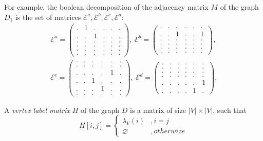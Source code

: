 For example, the boolean decomposition of the adjacency matrix $M$ of the graph $D_1$ is the set of matrices $\mathcal{E}^a, \mathcal{E}^b, \mathcal{E}^c, \mathcal{E}^d$:
{
    \renewcommand{\arraystretch}{0.5}
    \setlength\arraycolsep{1.5pt}
\begin{align*}
\mathcal{E}^a =
\begin{pmatrix}
    . & 1 & . & . & . & . \\
    . & . & 1 & . & . & . \\
    . & . & . & . & . & . \\
    . & . & . & . & . & . \\
    . & . & . & . & . & . \\
    . & . & . & . & . & .
\end{pmatrix},~
\mathcal{E}^b =
\begin{pmatrix}
    . & . & . & . & . & . \\
    . & . & 1 & . & . & 1 \\
    . & . & . & . & . & . \\
    . & . & . & . & . & . \\
    . & . & . & . & . & . \\
    . & . & . & . & . & .
\end{pmatrix},\\
\mathcal{E}^c =
\begin{pmatrix}
    . & . & . & . & . & . \\
    . & . & . & . & . & . \\
    . & . & . & . & 1 & . \\
    . & . & 1 & . & . & . \\
    . & . & . & 1 & . & . \\
    . & . & . & . & . & .
\end{pmatrix},~
\mathcal{E}^d =
\begin{pmatrix}
    . & . & . & . & . & . \\
    . & . & . & . & . & . \\
    . & . & . & . & . & . \\
    . & . & . & . & . & . \\
    . & . & . & . & . & 1 \\
    . & . & . & . & 1 & .
\end{pmatrix}.
\end{align*}
}

\begin{definition}

A \emph{vertex label matrix} $H$ of the graph $D$ is a matrix of size $|V|\times|V|$, such that
\begin{equation*}
H[i,j] =
  \begin{cases}
    \lambda_V (i) &, i = j \\
    \varnothing   &, otherwize
  \end{cases}
\end{equation*}
\end{definition}

